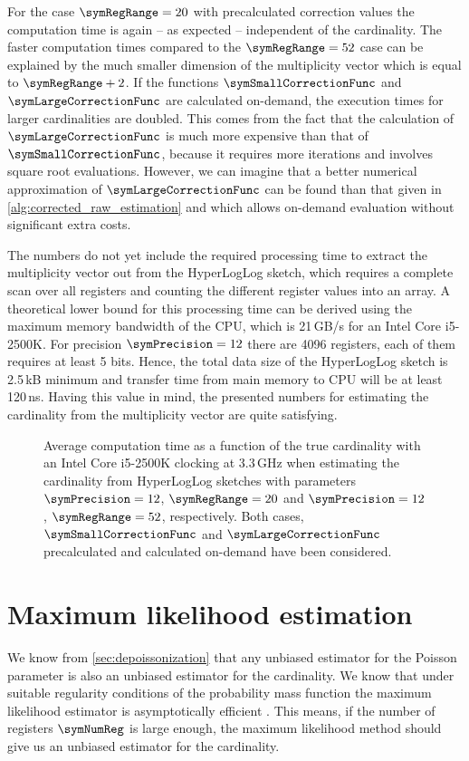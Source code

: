 \documentclass[a4paper]{scrartcl}
\begin{document}
For the case $\symRegRange=20$ with precalculated correction values the computation time is again -- as expected -- independent of the cardinality. The faster computation times compared to the $\symRegRange=52$ case can be explained by the much smaller dimension of the multiplicity vector which is equal to $\symRegRange+2$. If the functions $\symSmallCorrectionFunc$ and $\symLargeCorrectionFunc$ are calculated on-demand, the execution times for larger cardinalities are doubled. This comes from the fact that the calculation of $\symLargeCorrectionFunc$ is much more expensive than that of $\symSmallCorrectionFunc$, because it requires more iterations and involves square root evaluations. However, we can imagine that a better numerical approximation of $\symLargeCorrectionFunc$ can be found than that given in \cref{alg:corrected_raw_estimation} and which allows on-demand evaluation without significant extra costs.

The numbers do not yet include the required processing time to extract the multiplicity vector out from the HyperLogLog sketch, which requires a complete scan over all registers and counting the different register values into an array. A theoretical lower bound for this processing time can be derived using the maximum memory bandwidth of the CPU, which is 21\,GB/s for an Intel Core i5-2500K. For precision $\symPrecision=12$ there are 4096 registers, each of them requires at least 5 bits. Hence, the total data size of the HyperLogLog sketch is 2.5\,kB minimum and transfer time from main memory to CPU will be at least 120\,ns. Having this value in mind, the presented numbers for estimating the cardinality from the multiplicity vector are quite satisfying. 

\begin{figure}
\centering

\caption{Average computation time as a function of the true cardinality with an Intel Core i5-2500K clocking at 3.3\,GHz when estimating the cardinality from HyperLogLog sketches with parameters $\symPrecision=12$, $\symRegRange=20$ and $\symPrecision=12$, $\symRegRange=52$, respectively. Both cases, $\symSmallCorrectionFunc$ and $\symLargeCorrectionFunc$ precalculated and calculated on-demand have been considered.}
\label{fig:corrected_raw_avg_exec_time}
\end{figure}

\section{Maximum likelihood estimation}
We know from \cref{sec:depoissonization} that any unbiased estimator for the Poisson parameter is also an unbiased estimator for the cardinality. We know that under suitable regularity conditions of the probability mass function the maximum likelihood estimator is asymptotically efficient \cite{Casella2002}. This means, if the number of registers $\symNumReg$ is large enough, the maximum likelihood method should give us an unbiased estimator for the cardinality.
\end{document}
